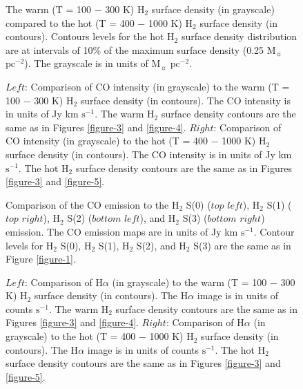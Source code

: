 \documentclass[manuscript]{aastex}
\begin{document}
\clearpage

\begin{figure}
\caption{The warm (T = 100 $-$ 300 K) $\mathrm{H_2}$ surface density (in grayscale) compared to
 the hot (T = 400 $-$ 1000 K) $\mathrm{H_2}$ surface density (in contours).  Contours levels for the 
 hot $\mathrm{H_2}$ surface density distribution are at intervals of 10\% of the maximum surface density 
 (0.25 $\mathrm{M_\sun}$ $\mathrm{pc^{-2}}$).  The grayscale is in units of 
 $\mathrm{M_\sun}$ $\mathrm{pc^{-2}}$.}
\label{figure-6}
\end{figure}

\clearpage

\begin{figure}
\caption{$Left$: Comparison of  CO intensity (in grayscale) to the warm (T = 100 $-$ 300 K) 
$\mathrm{H_2}$ surface density (in contours).  The CO intensity is in units of Jy km $\mathrm{s^{-1}}$. 
The warm $\mathrm{H_2}$ surface density contours are the same as in Figures \ref{figure-3} and \ref{figure-4}.  $Right$: Comparison of CO intensity (in grayscale) to the hot (T = 400 $-$ 1000 K) 
$\mathrm{H_2}$ surface density (in contours).  The CO intensity is in units of Jy km 
$\mathrm{s^{-1}}$. The hot $\mathrm{H_2}$ surface density contours are the same as in 
Figures \ref{figure-3} and \ref{figure-5}.}
\label{figure-7}
\end{figure}

\clearpage

\begin{figure}
\caption{Comparison of the CO emission to the $\mathrm{H_2}$ S(0) ($top$ $left$), 
 $\mathrm{H_2}$ S(1) ($top$ $right$),  $\mathrm{H_2}$ S(2) ($bottom$ $left$),  and 
 $\mathrm{H_2}$ S(3) ($bottom$ $right$) emission.  The CO emission maps are in 
 units of Jy km $\mathrm{s^{-1}}$.  Contour levels for $\mathrm{H_2}$ S(0), 
 $\mathrm{H_2}$ S(1), $\mathrm{H_2}$ S(2), and $\mathrm{H_2}$ S(3) are the 
 same as in Figure \ref{figure-1}.}
\label{figure-8}
\end{figure}

\clearpage

\begin{figure}
\caption{$Left$: Comparison of  H$\alpha$ (in grayscale) to the warm (T = 100 $-$ 300 K) 
$\mathrm{H_2}$ surface density (in contours).  The H$\alpha$ image is in units of counts $\mathrm{s^{-1}}$. The warm $\mathrm{H_2}$ surface density contours are the same as in Figures \ref{figure-3} and \ref{figure-4}.  $Right$: Comparison of H$\alpha$ (in grayscale) to the hot (T = 400 $-$ 1000 K) $\mathrm{H_2}$ surface density (in contours).  The H$\alpha$ image is in units of counts $\mathrm{s^{-1}}$. The hot $\mathrm{H_2}$ surface density contours are the same as in Figures \ref{figure-3} and \ref{figure-5}.}
\label{figure-9}
\end{figure}
\end{document}
